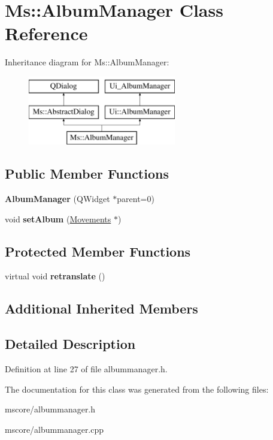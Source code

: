 \hypertarget{class_ms_1_1_album_manager}{}\section{Ms\+:\+:Album\+Manager Class Reference}
\label{class_ms_1_1_album_manager}
Inheritance diagram for Ms\+:\+:Album\+Manager\+:\begin{figure}[H]
\begin{center}
\leavevmode
\includegraphics[height=3.000000cm]{class_ms_1_1_album_manager}
\end{center}
\end{figure}
\subsection*{Public Member Functions}
\begin{DoxyCompactItemize}
\item 
\mbox{\label{class_ms_1_1_album_manager_a00c3b5913c84af5a96ce14ab2bd550d1}} 
{\bfseries Album\+Manager} (Q\+Widget $\ast$parent=0)
\item 
\mbox{\label{class_ms_1_1_album_manager_a75fc4bbeaf857704bfeff24bba7d6cf5}} 
void {\bfseries set\+Album} (\hyperlink{class_ms_1_1_movements}{Movements} $\ast$)
\end{DoxyCompactItemize}
\subsection*{Protected Member Functions}
\begin{DoxyCompactItemize}
\item 
\mbox{\label{class_ms_1_1_album_manager_ad1e7f65685a4ea398b4182a52a1e36fc}} 
virtual void {\bfseries retranslate} ()
\end{DoxyCompactItemize}
\subsection*{Additional Inherited Members}


\subsection{Detailed Description}


Definition at line 27 of file albummanager.\+h.



The documentation for this class was generated from the following files\+:\begin{DoxyCompactItemize}
\item 
mscore/albummanager.\+h\item 
mscore/albummanager.\+cpp\end{DoxyCompactItemize}
